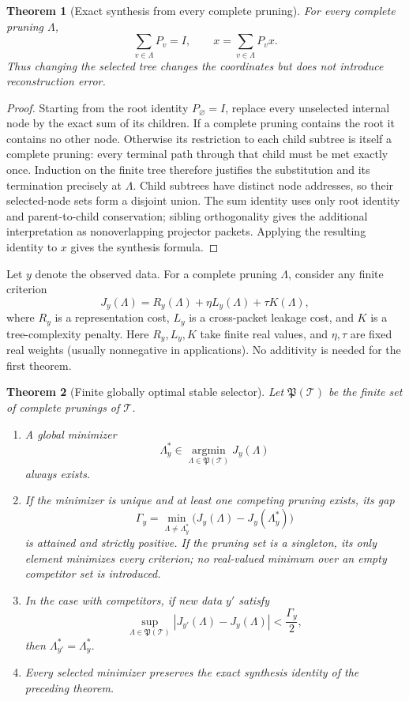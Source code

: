 \documentclass[11pt,a4paper]{article}
\newtheorem{theorem}{Theorem}[section]
\theoremstyle{definition}
\theoremstyle{remark}
\begin{document}
\begin{theorem}[Exact synthesis from every complete pruning]\label{result:13}
For every complete pruning $\Lambda$,
\[
\boxed{\sum_{v\in\Lambda}P_v=I,}
\qquad
\boxed{x=\sum_{v\in\Lambda}P_vx.}
\]
Thus changing the selected tree changes the coordinates but does not introduce reconstruction error.
\end{theorem}

\begin{proof}
Starting from the root identity $P_{\varnothing}=I$, replace every unselected internal node by the exact sum of its children.  If a complete pruning contains the root it contains no other node. Otherwise its restriction to each child subtree is itself a complete pruning: every terminal path through that child must be met exactly once. Induction on the finite tree therefore justifies the substitution and its termination precisely at $\Lambda$. Child subtrees have distinct node addresses, so their selected-node sets form a disjoint union. The sum identity uses only root identity and parent-to-child conservation; sibling orthogonality gives the additional interpretation as nonoverlapping projector packets.  Applying the resulting identity to $x$ gives the synthesis formula.
\end{proof}

Let $y$ denote the observed data.  For a complete pruning $\Lambda$, consider any finite criterion
\[
J_y(\Lambda)
=
R_y(\Lambda)
+\eta L_y(\Lambda)
+\tau K(\Lambda),
\]
where $R_y$ is a representation cost, $L_y$ is a cross-packet leakage cost, and $K$ is a tree-complexity penalty.  Here $R_y,L_y,K$ take finite real values, and $\eta,\tau$ are fixed real weights (usually nonnegative in applications). No additivity is needed for the first theorem.

\begin{theorem}[Finite globally optimal stable selector]\label{result:14}
Let $\mathfrak P(\mathcal T)$ be the finite set of complete prunings of $\mathcal T$.

\begin{enumerate}[label=(\roman*)]
\item A global minimizer
\[
\Lambda_y^*\in\operatorname*{argmin}_{\Lambda\in\mathfrak P(\mathcal T)}J_y(\Lambda)
\]
always exists.
\item If the minimizer is unique and at least one competing pruning exists, its gap
\[
\Gamma_y
=
\min_{\Lambda\ne\Lambda_y^*}
\bigl(J_y(\Lambda)-J_y(\Lambda_y^*)\bigr)
\]
is attained and strictly positive. If the pruning set is a singleton, its only element minimizes every criterion; no real-valued minimum over an empty competitor set is introduced.
\item In the case with competitors, if new data $y'$ satisfy
\[
\sup_{\Lambda\in\mathfrak P(\mathcal T)}
|J_{y'}(\Lambda)-J_y(\Lambda)|
<\frac{\Gamma_y}{2},
\]
then $\Lambda_{y'}^*=\Lambda_y^*$.
\item Every selected minimizer preserves the exact synthesis identity of the preceding theorem.
\end{enumerate}
\end{theorem}
\end{document}
